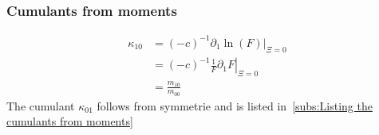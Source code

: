 \documentclass{article}
\begin{document}
\subsubsection{Cumulants from moments}
\label{subs:Cumulants from moments}

\begin{equation*}
  \begin{aligned}
    \kappa_{10} & = {(-c)}^{-1} \left.\partial_1 \ln(F) \right|_{\Xi = 0} \\
    & = {(-c)}^{-1} \left. \frac{1}{F} \partial_1 F \right|_{\Xi = 0} \\
    & = \frac{m_{10}}{m_{00}}
  \end{aligned}
\end{equation*}
The cumulant $\kappa_{01}$ follows from symmetrie and is listed in~\ref{subs:Listing the cumulants from moments}
\end{document}
